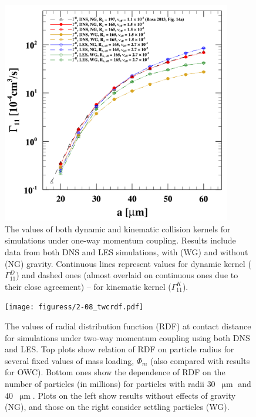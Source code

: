 
\begin{figure}[h]
\centering
\includegraphics[width=10cm]{figures/2-07_owcgamma.pdf}
\caption{
The values of both dynamic and kinematic collision kernels for simulations under one-way momentum coupling.
Results include data from both DNS and LES simulations, with (WG) and without (NG) gravity.
Continuous lines represent values for dynamic kernel ($\Gamma_{11}^D$) and dashed ones (almost overlaid on continuous ones due to their close agreement) -- for kinematic kernel ($\Gamma_{11}^K$). 
}
\label{fig:owcgamma}
\end{figure}


\begin{figure}
\centering
\texttt{[image: figuress/2-08\_twcrdf.pdf]}
\caption{
The values of radial distribution function (RDF) at contact distance for simulations under two-way momentum coupling using both DNS and LES.
Top plots show relation of RDF on particle radius for several fixed values of mass loading, $\Phi_m$ (also compared with results for OWC).
Bottom ones show the dependence of RDF on the number of particles (in millions) for particles with radii $30$~$\upmu\text{m}$ and $40$~$\upmu\text{m}$.
Plots on the left show results without effects of gravity (NG), and those on the right consider settling particles (WG).
}
\label{fig:twcrdf}
\end{figure}


